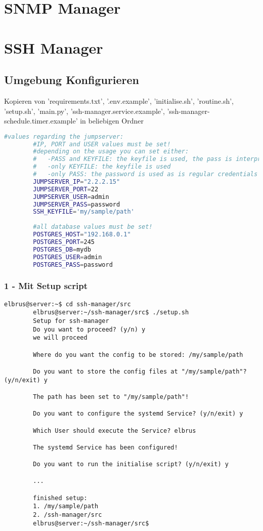 \documentclass{article}
\begin{document}
	\section{SNMP Manager}
	\newpage
	
	\section{SSH Manager}
	\subsection[file config]{Umgebung Konfigurieren}
	
	Kopieren von 'requirements.txt', '.env.example', 'initialise.sh', 'routine.sh', 'setup.sh', 'main.py', 'ssh-manager.service.example', 'ssh-manager-schedule.timer.example' in beliebigen Ordner 
	
	\lstset{style=files}
	\begin{lstlisting}[caption={Anhand von '.env.example' eigene '.env' Datei anlegen}, language=bash]
		#values regarding the jumpserver:
		#IP, PORT and USER values must be set!
		#depending on the usage you can set either:
		#   -PASS and KEYFILE: the keyfile is used, the pass is interpreted as the passphrase
		#   -only KEYFILE: the keyfile is used
		#   -only PASS: the password is used as is regular credentials
		JUMPSERVER_IP="2.2.2.15"
		JUMPSERVER_PORT=22
		JUMPSERVER_USER=admin
		JUMPSERVER_PASS=password
		SSH_KEYFILE='my/sample/path'
		
		#all database values must be set!
		POSTGRES_HOST="192.168.0.1"
		POSTGRES_PORT=245
		POSTGRES_DB=mydb
		POSTGRES_USER=admin
		POSTGRES_PASS=password
	\end{lstlisting}
	
	\subsubsection{1 - Mit Setup script}
	\lstset{style=commands}
	\begin{lstlisting}[caption={Ausführen des setup Scripts}]
		elbrus@server:~$ cd ssh-manager/src
		elbrus@server:~/ssh-manager/src$ ./setup.sh
		Setup for ssh-manager
		Do you want to proceed? (y/n) y
		we will proceed
		
		Where do you want the config to be stored: /my/sample/path
		
		Do you want to store the config files at "/my/sample/path"? (y/n/exit) y
		
		The path has been set to "/my/sample/path"!
		
		Do you want to configure the systemd Service? (y/n/exit) y
		
		Which User should execute the Service? elbrus
		
		The systemd Service has been configured!
		
		Do you want to run the initialise script? (y/n/exit) y
		
		...
		
		finished setup:
		1. /my/sample/path
		2. /ssh-manager/src
		elbrus@server:~/ssh-manager/src$
	\end{lstlisting}
	
\end{document}
